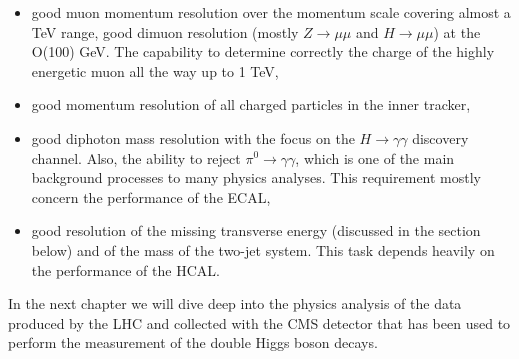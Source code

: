 \begin{normalsize}
\begin{itemize}
\item good muon momentum resolution over the momentum scale covering almost a TeV range, good dimuon resolution (mostly $Z \rightarrow \mu \mu$ and $H \rightarrow \mu \mu$) at the O(100) GeV. The capability to determine correctly the charge of the highly energetic muon all the way up to 1 TeV,
\item good momentum resolution of all charged particles in the inner tracker,
\item good diphoton mass resolution with the focus on the $H \rightarrow \gamma \gamma$ discovery channel. Also, the ability to reject $\pi^0 \rightarrow \gamma \gamma$, which is one of the main background processes to many physics analyses.  This requirement mostly concern the performance of the ECAL,
\item good resolution of the missing transverse energy (discussed in the section below) and of the mass of the two-jet system. This task depends heavily on the performance of the HCAL.
\end{itemize}

In the next chapter we will dive deep into the physics analysis of the data produced by the LHC and collected with the CMS detector that has been used to perform the measurement of the double Higgs boson decays.


\end{normalsize}       %
 
